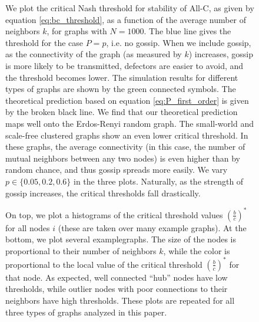 \documentclass{article}
\renewcommand{\=}[1]{\stackrel{#1}{=}} %
\begin{document}
\begin{figure}
\noindent{}
\noindent{}
\caption{
We plot the critical Nash threshold for stability of All-C, as given by equation \ref{eq:bc_threshold}, as a function of the average number of neighbors $k$, for graphs with $N = 1000$. The blue line gives the threshold for the case $P=p$, i.e. no gossip. When we include gossip, as the connectivity of the graph (as measured by $k$) increases, gossip is more likely to be transmitted, defectors are easier to avoid, and the threshold becomes lower. The simulation results for different types of graphs are shown by the green connected symbols. The theoretical prediction based on equation \ref{eq:P_first_order} is given by the broken black line. We find that our theoretical prediction maps well onto the Erdos-Renyi random graph. The small-world and scale-free clustered graphs show an even lower critical threshold. In these graphs, the average connectivity (in this case, the number of mutual neighbors between any two nodes) is even higher than by random chance, and thus gossip spreads more easily. We vary $p \in \{0.05,0.2,0.6\}$ in the three plots. Naturally, as the strength of gossip increases, the critical thresholds fall drastically.}

\label{fig:b_c_critical}
\end{figure}
 


\begin{figure}
\noindent{}
\noindent{}
\caption{
On top, we plot a histograms of the critical threshold values $\left(\frac{b}{c}\right)^*$ for all nodes $i$ (these are taken over many example graphs). At the bottom, we plot several examplegraphs. The size of the nodes is proportional to their number of neighbors $k$, while the color is proportional to the local value of the critical threshold $\left(\frac{b}{c}\right)^*$ for that node. As expected, well connected ``hub'' nodes have low thresholds, while outlier nodes with poor connections to their neighbors have high thresholds. These plots are repeated for all three types of graphs analyzed in this paper.}

\label{fig:local_thresholds}
\end{figure}



                

    
    
    
    
\end{document}

